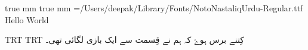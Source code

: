 \protected\edef{}
\protected\edef{}
 true mm
 true mm
\hoffset=1in
\voffset=1in
\nopagenumbers
\parindent=0pt
\font\noto={/Users/deepak/Library/Fonts/NotoNastaliqUrdu-Regular.ttf}
Hello World

\textdir TRT
\pardir TRT
\noto
کِتنے برس ہوۓ کہ ہم نے قِسمت سے ایک بازی لگائی تھی۔
\bye
